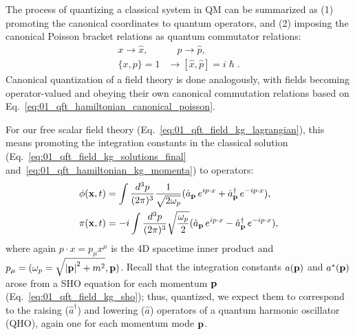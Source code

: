 The process of quantizing a classical system in QM can be summarized as (1) promoting the canonical coordinates to quantum operators, and (2) imposing the canonical Poisson bracket relations as quantum commutator relations:
\begin{equation}
	\label{eq:01_qft_quantization}
	\begin{split}
		x \rightarrow \hat x,& \quad p \rightarrow \hat p, \\
		\{x, p\} = 1 &\rightarrow [\hat x, \hat p] = i\hslash.
	\end{split}
\end{equation}
Canonical quantization of a field theory is done analogously, with fields becoming operator-valued and obeying their own canonical commutation relations based on Eq.~\ref{eq:01_qft_hamiltonian_canonical_poisson}.

For our free scalar field theory (Eq.~\ref{eq:01_qft_field_kg_lagrangian}), this means promoting the integration constants in the classical solution (Eq.~\ref{eq:01_qft_field_kg_solutions_final} and~\ref{eq:01_qft_hamiltonian_kg_momenta}) to operators:
\begin{equation}
	\label{eq:01_qft_quantization_fsf_fields}
    \begin{split}
    \phi(\mathbf{x}, t) &= \int \frac{d^3p}{(2\pi)^3} \frac{1}{\sqrt{2\omega_p}} (\hat a_{\mathbf{p}}\,e^{ip\cdot x} + \hat a^\dagger_{\mathbf{p}}\, e^{-ip\cdot x}), \\
    \pi(\mathbf{x}, t) &= -i\int \frac{d^3p}{(2\pi)^3} \sqrt{\frac{\omega_p}{2}} (\hat a_{\mathbf{p}}\,e^{ip\cdot x} - \hat a^\dagger_{\mathbf{p}}\, e^{-ip\cdot x}),
    \end{split}
\end{equation}
where again $p \cdot x = p_\mu x^\mu$ is the 4D spacetime inner product and $p_\mu = (\omega_p = \sqrt{\left\lvert \mathbf{p} \right\rvert^2 + m^2}, \mathbf{p})$.
Recall that the integration constants $a(\mathbf{p})$ and $a^*(\mathbf{p})$ arose from a SHO equation for each momentum $\mathbf{p}\,$ (Eq.~\ref{eq:01_qft_field_kg_sho}); thus, quantized, we expect them to correspond to the raising ($\hat a^\dagger$) and lowering ($\hat a$) operators of a quantum harmonic oscillator (QHO), again one for each momentum mode $\mathbf{p}$.

